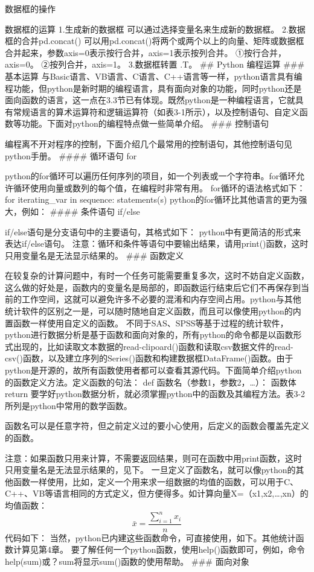 \documentclass[ignorenonframetext,11pt,xcolor=dvipsnames,aspectratio=1610,hyperref={bookmarksdepth=4}]{beamer}
\begin{document}
\begin{frame}{数据框的操作}
\begin{block}{数据框的运算}
1.生成新的数据框 可以通过选择变量名来生成新的数据框。
2.数据框的合并pd.concat()
可以用pd.concat()将两个或两个以上的向量、矩阵或数据框合并起来，参数axis=0表示按行合并，axis=1表示按列合并。
①按行合并，axis=0。 ②按列合并，axis=1。 3.数据框转置 .T。 \#\# Python
编程运算 \#\#\# 基本运算
与Basic语言、VB语言、C语言、C++语言等一样，python语言具有编程功能，但python是新时期的编程语言，具有面向对象的功能，同时python还是面向函数的语言，这一点在3.3节已有体现。既然python是一种编程语言，它就具有常规语言的算术运算符和逻辑运算符（如表3-1所示），以及控制语句、自定义函数等功能。下面对python的编程特点做一些简单介绍。
\#\#\# 控制语句

编程离不开对程序的控制，下面介绍几个最常用的控制语句，其他控制语句见python手册。
\#\#\#\# 循环语句 for

python的for循环可以遍历任何序列的项目，如一个列表或一个字符串。for循环允许循环使用向量或数列的每个值，在编程时非常有用。
for循环的语法格式如下： for iterating\_var in sequence: statements(s)
python的for循环比其他语言的更为强大，例如： \#\#\#\# 条件语句 if/else

if/else语句是分支语句中的主要语句，其格式如下：
python中有更简洁的形式来表达if/else语句。
注意：循环和条件等语句中要输出结果，请用print()函数，这时只用变量名是无法显示结果的。
\#\#\# 函数定义

在较复杂的计算问题中，有时一个任务可能需要重复多次，这时不妨自定义函数，这么做的好处是，函数内的变量名是局部的，即函数运行结束后它们不再保存到当前的工作空间，这就可以避免许多不必要的混淆和内存空间占用。python与其他统计软件的区别之一是，可以随时随地自定义函数，而且可以像使用python的内置函数一样使用自定义的函数。
不同于SAS、SPSS等基于过程的统计软件，python进行数据分析是基于函数和面向对象的，所有python的命令都是以函数形式出现的，比如读取文本数据的read-clipoard()函数和读取csv数据文件的read-csv()函数，以及建立序列的Series()函数和构建数据框DataFrame()函数。由于python是开源的，故所有函数使用者都可以查看其源代码。下面简单介绍python的函数定义方法。定义函数的句法：
def 函数名（参数1，参数2，\ldots）： 函数体 return
要学好python数据分析，就必须掌握python中的函数及其编程方法。表3-2所列是python中常用的数学函数。

函数名可以是任意字符，但之前定义过的要小心使用，后定义的函数会覆盖先定义的函数。

注意：如果函数只用来计算，不需要返回结果，则可在函数中用print函数，这时只用变量名是无法显示结果的，见下。
一旦定义了函数名，就可以像python的其他函数一样使用，比如，定义一个用来求一组数据的均值的函数，可以用于C、C++、VB等语言相同的方式定义，但方便得多。如计算向量X=（x1,x2,\ldots,xn）的均值函数：
\[\bar x =\frac{\sum_{i=1}^nx_i}{n}\] 代码如下：
当然，python已内建这些函数命令，可直接使用，如下。其他统计函数计算见第4章。
要了解任何一个python函数，使用help()函数即可，例如，命令help(sum)或？sum将显示sum()函数的使用帮助。
\#\#\# 面向对象


\end{block}
\end{frame}
\end{document}
